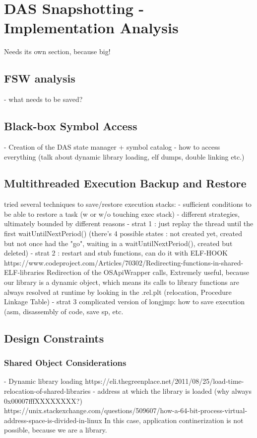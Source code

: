 {
\setlength{\parindent}{2em}
\chapter{DAS Snapshotting - Implementation Analysis}\label{cha:das-impl}
Needs its own section, because big!
\section{FSW analysis}
- what needs to be saved?
\section{Black-box Symbol Access}
- Creation of the DAS state manager + symbol catalog
- how to access everything (talk about dynamic library loading, elf dumps, double linking etc.)
\section{Multithreaded Execution Backup and Restore}
tried several techniques to save/restore execution stacks:
- sufficient conditions to be able to restore a task (w or w/o touching exec stack)
- different strategies, ultimately bounded by different reasons 
- strat 1 : just replay the thread until the first waitUntilNextPeriod() (there's 4 possible states : not created yet, created but not once had the "go", waiting in a waitUntilNextPeriod(), created but deleted)
- strat 2 : restart and stub functions, can do it with ELF-HOOK https://www.codeproject.com/Articles/70302/Redirecting-functions-in-shared-ELF-libraries
	Redirection of the OSApiWrapper calls, Extremely useful, because our library is a dynamic object, which means its calls to library functions are always resolved at runtime by looking in the .rel.plt (relocation, Procedure Linkage Table)
- strat 3 complicated version of longjmp: how to save execution (asm, disassembly of code, save sp, etc.%
\section{Design Constraints}
\subsection*{Shared Object Considerations}\label{sec:dynlib-considerations}
- Dynamic library loading  https://eli.thegreenplace.net/2011/08/25/load-time-relocation-of-shared-libraries
- address at which the library is loaded (why always 0x00007fffXXXXXXXX?) https://unix.stackexchange.com/questions/509607/how-a-64-bit-process-virtual-address-space-is-divided-in-linux
In this case, application continerization is not possible, because we are a library.

}